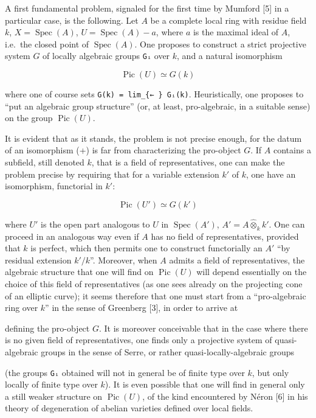 \documentclass[
  11pt,
  a4paper,
]{book}
\begin{document}
A first fundamental problem, signaled for the first time by Mumford
{[}5{]} in a particular case, is the following. Let \(A\) be a complete
local ring with residue field \(k\), \(X = \operatorname{Spec}(A)\),
\(U = \operatorname{Spec}(A) - {a}\), where \(a\) is the maximal ideal
of \(A\), i.e.~the closed point of \(\operatorname{Spec}(A)\). One
proposes to construct a strict projective system \(G\) of locally
algebraic groups \texttt{Gᵢ} over \(k\), and a natural isomorphism

\[ \operatorname{Pic}(U) \simeq G(k) \]

where one of course sets \texttt{G(k)\ =\ lim\_\{←\ \}\ Gᵢ(k)}.
Heuristically, one proposes to ``put an algebraic group structure'' (or,
at least, pro-algebraic, in a suitable sense) on the group
\(\operatorname{Pic}(U)\).

It is evident that as it stands, the problem is not precise enough, for
the datum of an isomorphism (+) is far from characterizing the
pro-object \(G\). If \(A\) contains a subfield, still denoted \(k\),
that is a field of representatives, one can make the problem precise by
requiring that for a variable extension \(k'\) of \(k\), one have an
isomorphism, functorial in \(k'\):

\[ \operatorname{Pic}(U') \simeq G(k') \]

where \(U'\) is the open part analogous to \(U\) in
\(\operatorname{Spec}(A')\), \(A' = A \hat{\otimes}_{k} k'\). One can
proceed in an analogous way even if \(A\) has no field of
representatives, provided that \(k\) is perfect, which then permits one
to construct functorially an \(A'\) ``by residual extension \(k'/k\)''.
Moreover, when \(A\) admits a field of representatives, the algebraic
structure that one will find on \(\operatorname{Pic}(U)\) will depend
essentially on the choice of this field of representatives (as one sees
already on the projecting cone of an elliptic curve); it seems therefore
that one must start from a ``pro-algebraic ring over \(k\)'' in the
sense of Greenberg {[}3{]}, in order to arrive at

defining the pro-object \(G\). It is moreover conceivable that in the
case where there is no given field of representatives, one finds only a
projective system of quasi-algebraic groups in the sense of Serre, or
rather quasi-locally-algebraic groups

(the groups \texttt{Gᵢ} obtained will not in general be of finite type
over \(k\), but only locally of finite type over \(k\)). It is even
possible that one will find in general only a still weaker structure on
\(\operatorname{Pic}(U)\), of the kind encountered by Néron {[}6{]} in
his theory of degeneration of abelian varieties defined over local
fields.
\end{document}
